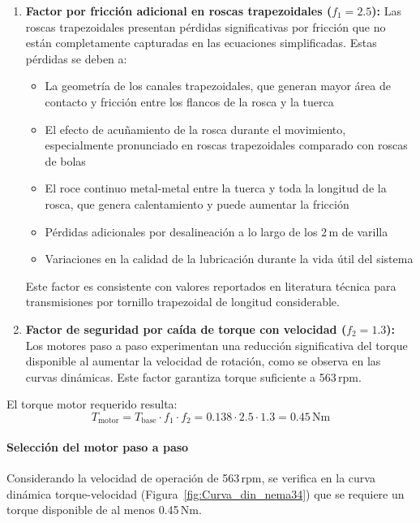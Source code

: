 \begin{enumerate}
    \item \textbf{Factor por fricción adicional en roscas trapezoidales ($f_1 = 2.5$):} Las roscas trapezoidales presentan pérdidas significativas por fricción que no están completamente capturadas en las ecuaciones simplificadas. Estas pérdidas se deben a:
    \begin{itemize}
        \item La geometría de los canales trapezoidales, que generan mayor área de contacto y fricción entre los flancos de la rosca y la tuerca
        \item El efecto de acuñamiento de la rosca durante el movimiento, especialmente pronunciado en roscas trapezoidales comparado con roscas de bolas
        \item El roce continuo metal-metal entre la tuerca y toda la longitud de la rosca, que genera calentamiento y puede aumentar la fricción
        \item Pérdidas adicionales por desalineación a lo largo de los 2\,m de varilla
        \item Variaciones en la calidad de la lubricación durante la vida útil del sistema
    \end{itemize}
    Este factor es consistente con valores reportados en literatura técnica para transmisiones por tornillo trapezoidal de longitud considerable.
    
    \item \textbf{Factor de seguridad por caída de torque con velocidad ($f_2 = 1.3$):} Los motores paso a paso experimentan una reducción significativa del torque disponible al aumentar la velocidad de rotación, como se observa en las curvas dinámicas. Este factor garantiza torque suficiente a 563\,rpm.
\end{enumerate}

El torque motor requerido resulta:
\begin{equation}
T_{\text{motor}} = T_{\text{base}} \cdot f_1 \cdot f_2 = 0.138 \cdot 2.5 \cdot 1.3 = 0.45\,\text{Nm}
\label{eq:torque_motor_vertical}
\end{equation}

\paragraph{Selección del motor paso a paso}
Considerando la velocidad de operación de 563\,rpm, se verifica en la curva dinámica torque-velocidad (Figura~\ref{fig:Curva_din_nema34}) que se requiere un torque disponible de al menos 0.45\,Nm.


